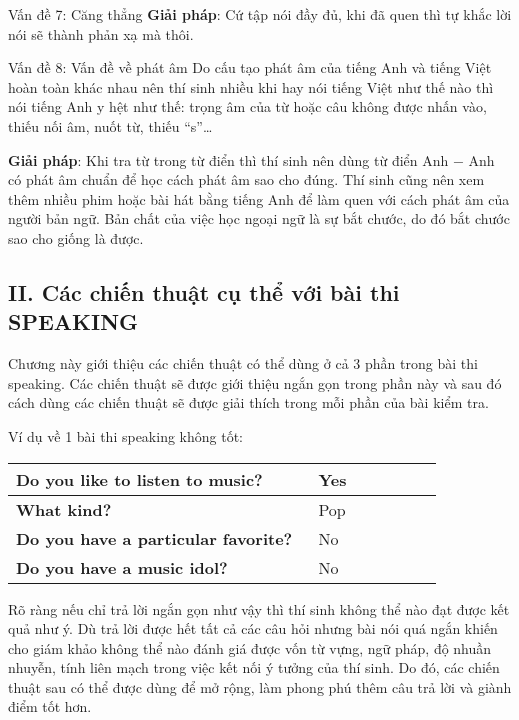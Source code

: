 \begin{multicols}{2}
\begin{qa}{Vấn đề 7: Căng thẳng}
\vspace{.2cm}
\textbf{Giải pháp}: Cứ tập nói đầy đủ, khi đã quen thì tự khắc lời nói sẽ thành phản xạ mà thôi.
\end{qa}

\begin{qa}{Vấn đề 8: Vấn đề về phát âm}
Do cấu tạo phát âm của tiếng Anh và tiếng Việt hoàn toàn khác nhau nên thí sinh nhiều khi hay nói tiếng Việt như thế nào thì nói tiếng Anh y hệt như thế: trọng âm của từ hoặc câu không được nhấn vào, thiếu nối âm, nuốt từ, thiếu “s”… 

\vspace{.2cm}
\textbf{Giải pháp}: Khi tra từ trong từ điển thì thí sinh nên dùng từ điển Anh $-$ Anh có phát âm chuẩn để học cách phát âm sao cho đúng. Thí sinh cũng nên xem thêm nhiều phim hoặc bài hát bằng tiếng Anh để làm quen với cách phát âm của người bản ngữ. Bản chất của việc học ngoại ngữ là sự bắt chước, do đó bắt chước sao cho giống là được.
\end{qa}
\end{multicols}


\subsection*{II. Các chiến thuật cụ thể với bài thi SPEAKING}


Chương này giới thiệu các chiến thuật có thể dùng ở cả 3 phần trong bài thi speaking. Các chiến thuật sẽ được giới thiệu ngắn gọn trong phần này và sau đó cách dùng các chiến thuật sẽ được giải thích trong mỗi phần của bài kiểm tra.

\medskip

Ví dụ về 1 bài thi speaking không tốt:

\begin{center}
\begin{tabular}{|p{0.6\linewidth}|p{0.25\linewidth}|}
\hline
\textbf{Do you like to listen to music?} & Yes \\
\hline
\textbf{What kind?} & Pop \\
\hline
\textbf{Do you have a particular favorite?} & No \\
\hline
\textbf{Do you have a music idol?} & No \\
\hline
\end{tabular}
\end{center}

\medskip

Rõ ràng nếu chỉ trả lời ngắn gọn như vậy thì thí sinh không thể nào đạt được kết quả như ý. 
Dù trả lời được hết tất cả các câu hỏi nhưng bài nói quá ngắn khiến cho giám khảo 
không thể nào đánh giá được vốn từ vựng, ngữ pháp, độ nhuần nhuyễn, tính liên mạch trong 
việc kết nối ý tưởng của thí sinh. Do đó, các chiến thuật sau có thể được dùng để mở rộng, 
làm phong phú thêm câu trả lời và giành điểm tốt hơn.

